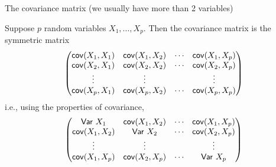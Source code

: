 \documentclass[aspectratio=169]{beamer}\usepackage[]{graphicx}\usepackage[]{xcolor}
\begin{document}
\begin{frame}{The covariance matrix (we usually have more than 2 variables)}
\begin{definition}
Suppose $p$ random variables $X_1,\ldots,X_p$. Then the covariance matrix is the symmetric matrix
\[
\begin{pmatrix}
\mathsf{cov}(X_1,X_1) & \mathsf{cov}(X_1,X_2) & \cdots & \mathsf{cov}(X_1,X_p) \\
\mathsf{cov}(X_2,X_1) & \mathsf{cov}(X_2,X_2) & \cdots & \mathsf{cov}(X_2,X_p) \\
\vdots & \vdots & & \vdots \\
\mathsf{cov}(X_p,X_1) & \mathsf{cov}(X_p,X_2) & \cdots & \mathsf{cov}(X_p,X_p) 
\end{pmatrix}
\]
i.e., using the properties of covariance,
\[
\begin{pmatrix}
\mathsf{Var}\  X_1 & \mathsf{cov}(X_1,X_2) & \cdots & \mathsf{cov}(X_1,X_p) \\
\mathsf{cov}(X_1,X_2) & \mathsf{Var}\  X_2 & \cdots & \mathsf{cov}(X_2,X_p) \\
\vdots & \vdots & & \vdots \\
\mathsf{cov}(X_1,X_p) & \mathsf{cov}(X_2,X_p) & \cdots & \mathsf{Var}\  X_p 
\end{pmatrix}
\]
\end{definition}
\end{frame}





\end{document}
